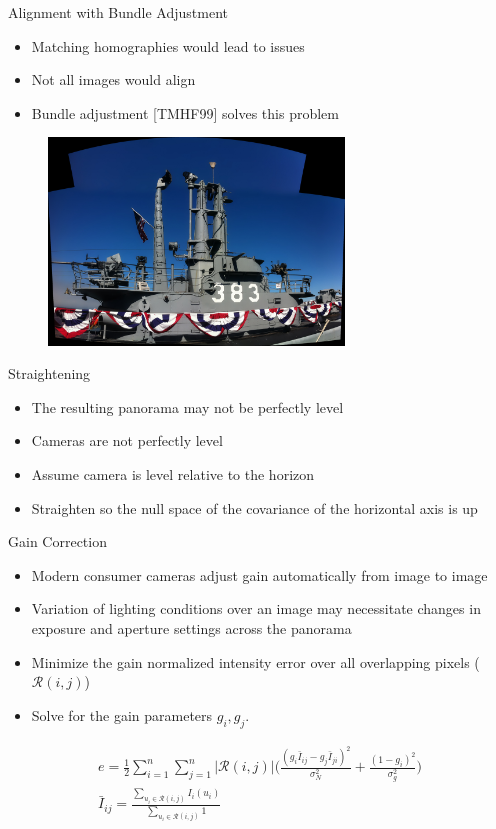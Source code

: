 \documentclass{beamer}
\begin{document}
\begin{frame}{Alignment with Bundle Adjustment}
	\begin{itemize}
		\item Matching homographies would lead to issues
		\item Not all images would align
		\item Bundle adjustment [TMHF99] solves this problem
	\end{itemize}
	\begin{figure}[H]
	\centering
	\includegraphics[width=0.7\textwidth]{Sub.jpg}
	\end{figure}
\end{frame}

\begin{frame}{Straightening}
	\begin{itemize}
		\item The resulting panorama may not be perfectly level
		\item Cameras are not perfectly level
		\item Assume camera is level relative to the horizon
		\item Straighten so the null space of the covariance of the horizontal axis is up
	\end{itemize}
\end{frame}

\begin{frame}{Gain Correction}
\begin{itemize}
	\item Modern consumer cameras adjust gain automatically from image to image
	\item Variation of lighting conditions over an image may necessitate changes in exposure and aperture settings across the panorama
	\item Minimize the gain normalized intensity error over all overlapping pixels ($\mathcal{R}(i,j)$)
	\item Solve for the gain parameters $g_i, g_j$.
\end{itemize}
\begin{align}
e = \frac{1}{2} \sum^n_{i=1} \sum^n_{j=1} |\mathcal{R}(i,j)| \Big(\frac{(g_i \bar{I}_{ij} - g_j \bar{I}_{ji})^2}{\sigma_N^2} + \frac{(1-g_i)^2}{\sigma_g^2}\Big)\\
\bar{I}_{ij} = \frac{\sum_{u_i \in \mathcal{R}(i,j)} I_i(u_i)}{\sum_{u_i \in \mathcal{R}(i,j)} 1}
\end{align}

\end{frame}
\end{document}
